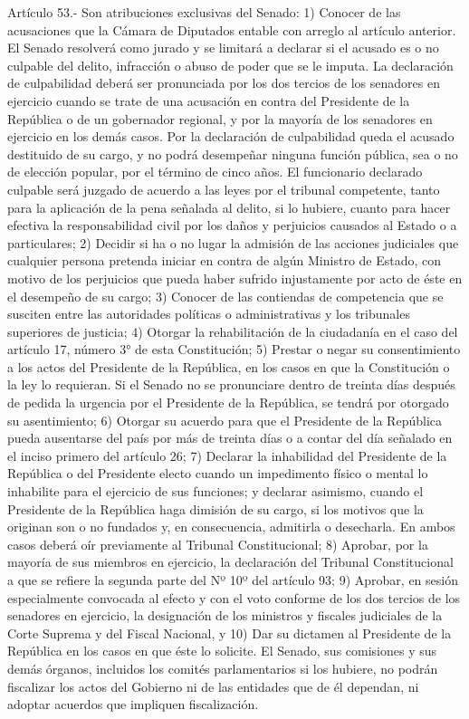     Artículo 53.- Son atribuciones exclusivas del Senado:
    1) Conocer de las acusaciones que la Cámara de Diputados entable con arreglo al artículo anterior.
    El Senado resolverá como jurado y se limitará a declarar si el acusado es o no culpable del delito, infracción o abuso de poder que se le imputa.
    La declaración de culpabilidad deberá ser pronunciada por los dos tercios de los senadores en ejercicio cuando se trate de una acusación en contra del Presidente de la República o de un gobernador regional, y por la mayoría de los senadores en ejercicio en los demás casos.
    Por la declaración de culpabilidad queda el acusado destituido de su cargo, y no podrá desempeñar ninguna función pública, sea o no de elección popular, por el término de cinco años.
    El funcionario declarado culpable será juzgado de acuerdo a las leyes por el tribunal competente, tanto para la aplicación de la pena señalada al delito, si lo hubiere, cuanto para hacer efectiva la responsabilidad civil por los daños y perjuicios causados al Estado o a particulares;
    2) Decidir si ha o no lugar la admisión de las acciones judiciales que cualquier persona pretenda iniciar en contra de algún Ministro de Estado, con motivo de los perjuicios que pueda haber sufrido injustamente por acto de éste en el desempeño de su cargo;
    3) Conocer de las contiendas de competencia que se susciten entre las autoridades políticas o administrativas y los tribunales superiores de justicia;
    4) Otorgar la rehabilitación de la ciudadanía en el caso del artículo 17, número 3° de esta Constitución;
    5) Prestar o negar su consentimiento a los actos del Presidente de la República, en los casos en que la Constitución o la ley lo requieran.
    Si el Senado no se pronunciare dentro de treinta días después de pedida la urgencia por el Presidente de la República, se tendrá por otorgado su asentimiento;
    6) Otorgar su acuerdo para que el Presidente de la República pueda ausentarse del país por más de treinta días o a contar del día señalado en el inciso primero del artículo 26;
    7) Declarar la inhabilidad del Presidente de la República o del Presidente electo cuando un impedimento físico o mental lo inhabilite para el ejercicio de sus funciones; y declarar asimismo, cuando el Presidente de la República haga dimisión de su cargo, si los motivos que la originan son o no fundados y, en consecuencia, admitirla o desecharla. En ambos casos deberá oír previamente al Tribunal Constitucional;
    8) Aprobar, por la mayoría de sus miembros en ejercicio, la declaración del Tribunal Constitucional a que se refiere la segunda parte del Nº 10º del artículo 93;
    9) Aprobar, en sesión especialmente convocada al efecto y con el voto conforme de los dos tercios de los senadores en ejercicio, la designación de los ministros y fiscales judiciales de la Corte Suprema y del Fiscal Nacional, y
    10) Dar su dictamen al Presidente de la República en los casos en que éste lo solicite.
    El Senado, sus comisiones y sus demás órganos, incluidos los comités parlamentarios si los hubiere, no podrán fiscalizar los actos del Gobierno ni de las entidades que de él dependan, ni adoptar acuerdos que impliquen fiscalización.





